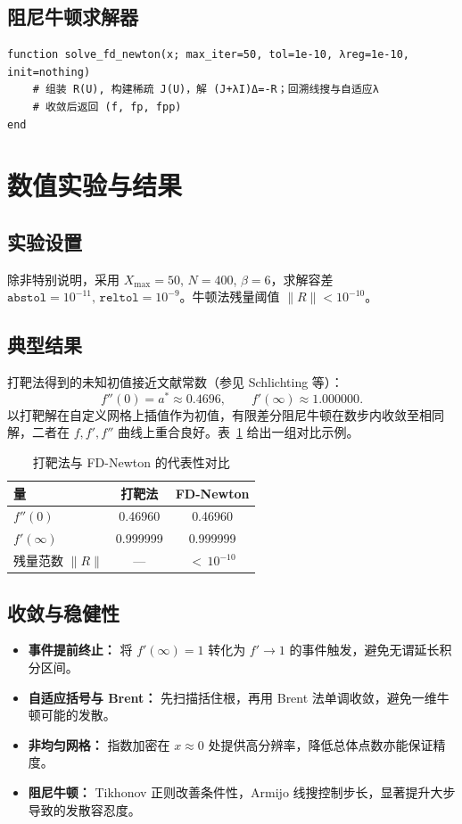 \documentclass[12pt]{article}
\begin{document}
\subsection*{阻尼牛顿求解器}
\begin{lstlisting}
function solve_fd_newton(x; max_iter=50, tol=1e-10, λreg=1e-10, init=nothing)
    # 组装 R(U), 构建稀疏 J(U)，解 (J+λI)Δ=-R；回溯线搜与自适应λ
    # 收敛后返回 (f, fp, fpp)
end
\end{lstlisting}

\section{数值实验与结果}
\subsection*{实验设置}
除非特别说明，采用 \(X_{\max}=50\), \(N=400\), \(\beta=6\)，求解容差 \(\texttt{abstol}=10^{-11},\, \texttt{reltol}=10^{-9}\)。牛顿法残量阈值 \(\|R\|<10^{-10}\)。

\subsection*{典型结果}
打靶法得到的未知初值接近文献常数（参见 Schlichting 等）：
\begin{equation}
  f''(0) = a^* \approx 0.4696,\qquad f'(\infty)\approx 1.000000.
\end{equation}
以打靶解在自定义网格上插值作为初值，有限差分阻尼牛顿在数步内收敛至相同解，二者在 \(f, f', f''\) 曲线上重合良好。表~\ref{tab:compare} 给出一组对比示例。

\begin{table}[h]
  \centering
  \caption{打靶法与 FD-Newton 的代表性对比}
  \label{tab:compare}
  \begin{tabular}{lcc}
    \toprule
    量 & 打靶法 & FD-Newton \\
    \midrule
    \(f''(0)\) & 0.46960 & 0.46960 \\
    \(f'(\infty)\) & 0.999999 & 0.999999 \\
    残量范数 \(\|R\|\) & — & $<\,10^{-10}$ \\
    \bottomrule
  \end{tabular}
\end{table}

\subsection*{收敛与稳健性}
\begin{itemize}[leftmargin=2em]
  \item \textbf{事件提前终止：} 将 \(f'(\infty)=1\) 转化为 \(f'\to 1\) 的事件触发，避免无谓延长积分区间。
  \item \textbf{自适应括号与 Brent：} 先扫描括住根，再用 Brent 法单调收敛，避免一维牛顿可能的发散。
  \item \textbf{非均匀网格：} 指数加密在 \(x\approx 0\) 处提供高分辨率，降低总体点数亦能保证精度。
  \item \textbf{阻尼牛顿：} Tikhonov 正则改善条件性，Armijo 线搜控制步长，显著提升大步导致的发散容忍度。
\end{itemize}
\end{document}
